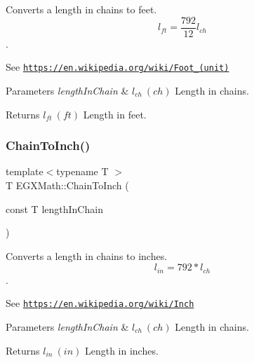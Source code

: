 Converts a length in chains to feet. \[ l_{ft}= \frac{792}{12} l_{ch} \]. 

See \href{https://en.wikipedia.org/wiki/Foot_(unit)}{\tt https\+://en.\+wikipedia.\+org/wiki/\+Foot\+\_\+(unit)} 
\begin{DoxyParams}{Parameters}
{\em length\+In\+Chain} & $ l_{ch}\ (ch)$ Length in chains. \\
\hline
\end{DoxyParams}
\begin{DoxyReturn}{Returns}
$ l_{ft}\ (ft)$ Length in feet. 
\end{DoxyReturn}
\mbox{\label{group___e_g_x_math-_conversions-_length_conversions-_surveyors-_chain-_imperial_gabbb970d9c4833232722a01a846c30bc8}} 
\subsubsection{\texorpdfstring{Chain\+To\+Inch()}{ChainToInch()}}
{\footnotesize\ttfamily template$<$typename T $>$ \\
T E\+G\+X\+Math\+::\+Chain\+To\+Inch (\begin{DoxyParamCaption}\item[{const T}]{length\+In\+Chain }\end{DoxyParamCaption})}



Converts a length in chains to inches. \[ l_{in}= 792 * l_{ch} \]. 

See \href{https://en.wikipedia.org/wiki/Inch}{\tt https\+://en.\+wikipedia.\+org/wiki/\+Inch} 
\begin{DoxyParams}{Parameters}
{\em length\+In\+Chain} & $ l_{ch}\ (ch)$ Length in chains. \\
\hline
\end{DoxyParams}
\begin{DoxyReturn}{Returns}
$ l_{in}\ (in)$ Length in inches. 
\end{DoxyReturn}
\mbox{\label{group___e_g_x_math-_conversions-_length_conversions-_surveyors-_chain-_imperial_gae1276611dce26e23deae1b0379b4394d}} 

